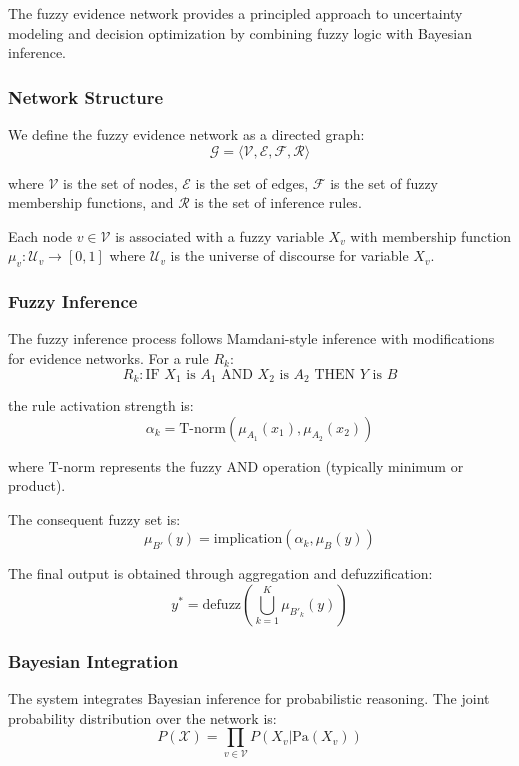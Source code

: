\documentclass[12pt,a4paper]{article}
\begin{document}
The fuzzy evidence network provides a principled approach to uncertainty modeling and decision optimization by combining fuzzy logic with Bayesian inference.

\subsubsection{Network Structure}

We define the fuzzy evidence network as a directed graph:
$$\mathcal{G} = \langle \mathcal{V}, \mathcal{E}, \mathcal{F}, \mathcal{R} \rangle$$

where $\mathcal{V}$ is the set of nodes, $\mathcal{E}$ is the set of edges, $\mathcal{F}$ is the set of fuzzy membership functions, and $\mathcal{R}$ is the set of inference rules.

Each node $v \in \mathcal{V}$ is associated with a fuzzy variable $X_v$ with membership function $\mu_v: \mathcal{U}_v \rightarrow [0,1]$ where $\mathcal{U}_v$ is the universe of discourse for variable $X_v$.

\subsubsection{Fuzzy Inference}

The fuzzy inference process follows Mamdani-style inference with modifications for evidence networks. For a rule $R_k$:
$$R_k: \text{IF } X_1 \text{ is } A_1 \text{ AND } X_2 \text{ is } A_2 \text{ THEN } Y \text{ is } B$$

the rule activation strength is:
$$\alpha_k = \text{T-norm}(\mu_{A_1}(x_1), \mu_{A_2}(x_2))$$

where T-norm represents the fuzzy AND operation (typically minimum or product).

The consequent fuzzy set is:
$$\mu_{B'}(y) = \text{implication}(\alpha_k, \mu_B(y))$$

The final output is obtained through aggregation and defuzzification:
$$y^* = \text{defuzz}\left(\bigcup_{k=1}^{K} \mu_{B'_k}(y)\right)$$

\subsubsection{Bayesian Integration}

The system integrates Bayesian inference for probabilistic reasoning. The joint probability distribution over the network is:
$$P(\mathcal{X}) = \prod_{v \in \mathcal{V}} P(X_v | \text{Pa}(X_v))$$
\end{document}
